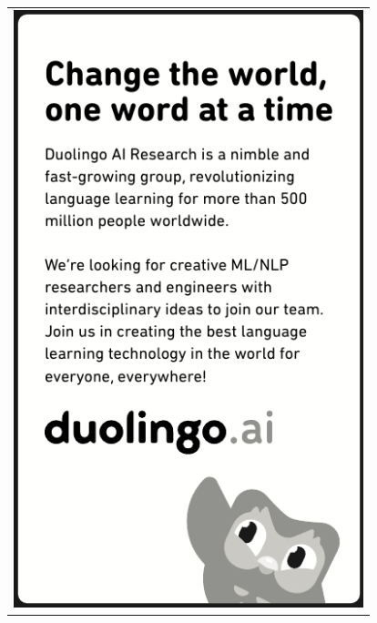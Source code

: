 \begin{center}
\begin{tabular}{c}
  \includegraphics[width=4in]{content/ads/silver/duolingo-emnlp21-quarter-ad.pdf} \\
\end{tabular}
\end{center}


